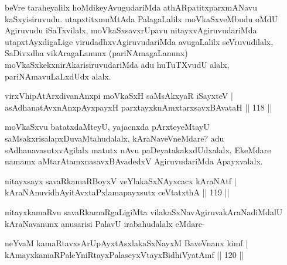 \begin{artha}
beVre taraheyalilx hoMdikeyAvugudariMda athARpatitx\-\break parxmANavu kaSxyisiruvudu. utapxtitxmuMtAda PalagaLalilx moVkaSxveMbudu oMdU Agiruvudu iSaTxvilalx, moVkaSxsavxrUpavu nitayxvAgiruvudariMda utapxtAyxdigaLige virudadhxvAgiruvudariMda avugaLalilx seVruvudilalx, SaDivxdha vikAragaLanunx (pariNAmagaLanunx) moVkaSxkekx\break nirAkarisiruvudariMda adu huTuTXvudU alalx, pariNAmavuLaLxdUdx alalx.
\end{artha}

\begin{shl}
\footnotemark{}virxVhipAtArxdivanAnxpi moVkaSxH saMsAkxyaR iSayxteV |\\
asAdhanatAvxnAnxpAyxpayxH parxtayxknAmxtarxsavxBAvataH \hfill || 118 ||
\end{shl}

\begin{artha}
moVkaSxvu batatxdaMteyU, yajacnxda pArxteyeMtayU saMsakxri\-\break salapxDuvaMtahudalalx, kAraNaveVneMdare? adu sAdhanavasutxvAgilalx matutx nAvu paDeyatakakxdUdxalalx, EkeMdare namamx aMtarAtamxna\break savxBAvadedxV AgiruvudariMda Apayxvalalx.
\end{artha}


\begin{shl}
nitayxsayx savaRkamaRBoyxV veYlakaSxNAyxcacx kAraNAtf |\\
kAraNAnuvidhAyitAvxtaPxlamapayxsutx ceVtatxthA \hfill || 119 ||
\end{shl}

\begin{artha}
nitayxkamaRvu savaRkamaRgaLigiMta vilakaSxNavAgiruvakAraNa\-\break diMdalU kAraNavanunx anusarisi PalavU irabahudalalx eMdare-
\end{artha}


\begin{shl}
neYvaM kamaRtavxsArUpAyxtAsxlakaSxNayxM BaveVnanx kimf |\\
kAmayxkamaRPaleYniRtayxPalaseyxVtayxBidhiVyatAmf \hfill || 120 ||
\end{shl}

